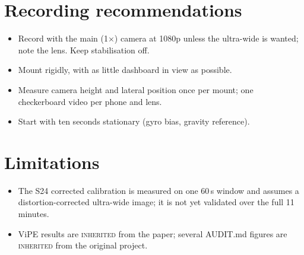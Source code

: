 \documentclass[10pt,a4paper]{article}
\newcommand{\inh}{\textsc{inherited}}
\begin{document}
\section{Recording recommendations}
\begin{itemize}
\item Record with the main (1$\times$) camera at 1080p unless the ultra-wide is wanted; note the lens. Keep
  stabilisation off.
\item Mount rigidly, with as little dashboard in view as possible.
\item Measure camera height and lateral position once per mount; one checkerboard video per phone and lens.
\item Start with ten seconds stationary (gyro bias, gravity reference).
\end{itemize}

\section{Limitations}
\begin{itemize}
\item The S24 corrected calibration is measured on one 60\,s window and assumes a distortion-corrected
  ultra-wide image; it is not yet validated over the full 11 minutes.
\item ViPE results are \inh{} from the paper; several AUDIT.md figures are \inh{} from the original project.
\end{itemize}
\end{document}
